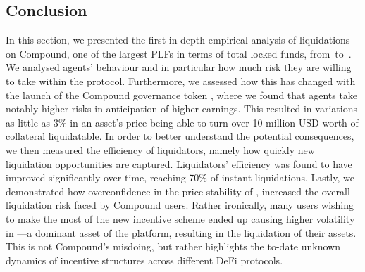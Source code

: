 \subsection{Conclusion}
\label{sec:conclusion}
In this section, we presented the first in-depth empirical analysis of liquidations on Compound, one of the largest PLFs in terms of total locked funds, from~\StartDate to~\EndDate.
We analysed agents' behaviour and in particular how much risk they are willing to take within the protocol.
Furthermore, we assessed how this has changed with the launch of the Compound governance token , where we found that agents take notably higher risks in anticipation of higher earnings.
This resulted in variations as little as 3\% in an asset's price being able to turn over 10 million USD worth of collateral liquidatable.
In order to better understand the potential consequences, we then measured the efficiency of liquidators, namely how quickly new liquidation opportunities are captured. Liquidators' efficiency was found to have improved significantly over time, reaching 70\% of instant liquidations.
Lastly, we demonstrated how overconfidence in the price stability of , increased the overall liquidation risk faced by Compound users.
Rather ironically, many users wishing to make the most of the new incentive scheme ended up causing higher volatility in ---a dominant asset of the platform, resulting in the liquidation of their assets.
This is not Compound's misdoing, but rather highlights the to-date unknown dynamics of incentive structures across different DeFi protocols.
